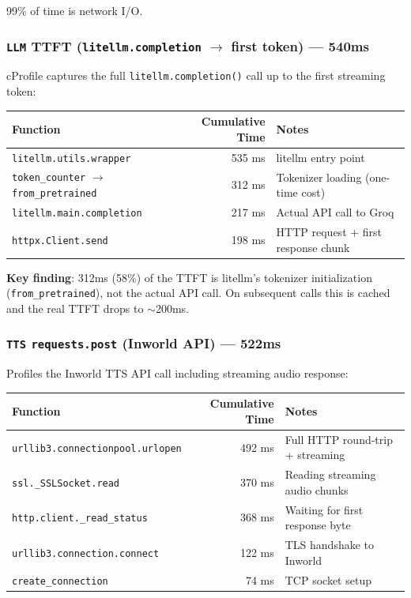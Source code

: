 99\% of time is network I/O.

\subsubsection{\texttt{LLM} TTFT (\texttt{litellm.completion} $\rightarrow$ first token) --- 540ms}

cProfile captures the full \texttt{litellm.completion()} call up to the first streaming token:

\begin{table}[h]
\centering
\begin{tabular}{|l|r|l|}
\hline
\textbf{Function} & \textbf{Cumulative Time} & \textbf{Notes} \\
\hline
\texttt{litellm.utils.wrapper} & 535 ms & litellm entry point \\
\texttt{token\_counter} $\rightarrow$ \texttt{from\_pretrained} & 312 ms & Tokenizer loading (one-time cost) \\
\texttt{litellm.main.completion} & 217 ms & Actual API call to Groq \\
\texttt{httpx.Client.send} & 198 ms & HTTP request + first response chunk \\
\hline
\end{tabular}
\end{table}

\textbf{Key finding}: 312ms (58\%) of the TTFT is litellm's tokenizer initialization (\texttt{from\_pretrained}), not the actual API call. On subsequent calls this is cached and the real TTFT drops to $\sim$200ms.

\subsubsection{\texttt{TTS} \texttt{requests.post} (Inworld API) --- 522ms}

Profiles the Inworld TTS API call including streaming audio response:

\begin{table}[h]
\centering
\begin{tabular}{|l|r|l|}
\hline
\textbf{Function} & \textbf{Cumulative Time} & \textbf{Notes} \\
\hline
\texttt{urllib3.connectionpool.urlopen} & 492 ms & Full HTTP round-trip + streaming \\
\texttt{ssl.\_SSLSocket.read} & 370 ms & Reading streaming audio chunks \\
\texttt{http.client.\_read\_status} & 368 ms & Waiting for first response byte \\
\texttt{urllib3.connection.connect} & 122 ms & TLS handshake to Inworld \\
\texttt{create\_connection} & 74 ms & TCP socket setup \\
\hline
\end{tabular}
\end{table}

